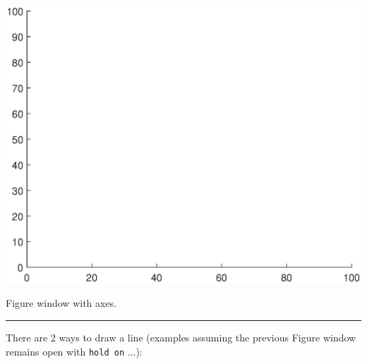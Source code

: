 \documentclass{tufte-book} %
\begin{document}
\begin{marginfigure}[0.0in]
\includegraphics[width=\linewidth]{ch3-graphics01.eps}
\caption{Figure window with axes.}
\label{fig:ch3-graphics01}
\end{marginfigure}

\vspace{1mm}
\noindent\rule{4cm}{0.5pt}
\vspace{2mm}

\noindent There are 2 ways to draw a line (examples assuming the previous Figure window remains open with \texttt{hold on} ...):
\end{document}
